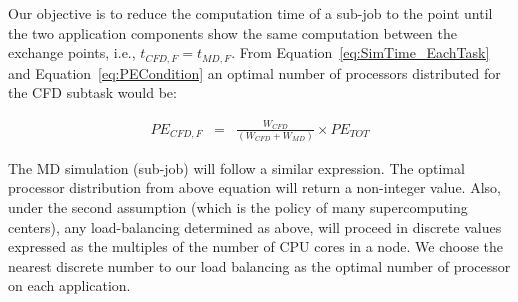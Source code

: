\documentclass[conference,final]{IEEEtran}
\begin{document}
Our objective is to reduce the computation time of a sub-job to the point until the two application components show the same computation between the exchange points, i.e., $t_{CFD,F} = t_{MD,F}$. From Equation~\ref{eq:SimTime_EachTask} and Equation~\ref{eq:PECondition} an optimal number of processors distributed for the CFD subtask would be:

\vspace{-.2em}
\footnotesize
\begin{eqnarray}
PE_{CFD,F} & = & \frac {W_{CFD}} {(W_{CFD} + W_{MD})} \times PE_{TOT}
\end{eqnarray}
\normalsize

The MD simulation (sub-job) will follow a similar expression. The optimal processor distribution from above equation will return a non-integer value. Also, under the second assumption (which is the policy of many supercomputing centers), any load-balancing determined as above, will proceed in discrete values expressed as the multiples of the number of CPU cores in a node. We choose the nearest discrete number to our load balancing as the optimal number of processor on each application.
\end{document}

